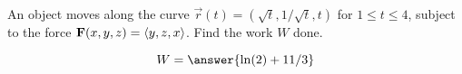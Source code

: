 \documentclass{ximera}
\author{David Guichard \and Neal Koblitz \and H. Jerome Keisler \and Albert Scheller \and Barry Balof \and Mike Wills \and Matthew Carr}
\begin{document}
\begin{exercise}




An object moves along the curve $\vec{r}(t)=(\sqrt{t},1/\sqrt{t},t)$ for $1\le t\le 4$, subject to the force $\mathbf{F}(x,y,z)=\left\langle y,z,x\right\rangle$. Find the work $W$ done.

\begin{prompt}
\[
W=\answer{\ln(2)+11/3}
\]
\end{prompt}



\end{exercise}
\end{document}
